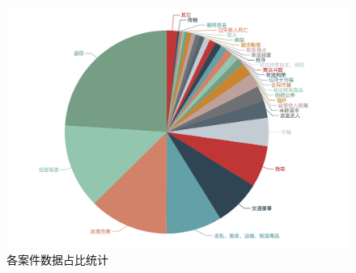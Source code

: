 \begin{figure}[ht]
	\centering
    \includegraphics[width=\linewidth]{figures/case_statistic.png}
    \caption{各案件数据占比统计}
    \label{fig:case_statistic}
\end{figure}
	

